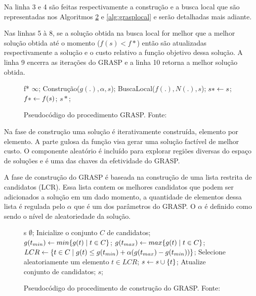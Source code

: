 Na linha 3 e 4 são feitas respectivamente a construção e a busca local que são representadas nos Algoritmos \ref{alg:graspcons} e \ref{alg:grasplocal} e serão detalhadas mais adiante.

Nas linhas 5 à 8, se a solução obtida na busca local for melhor que a melhor solução obtida até o momento ($f(s) < f{*}$) então são atualizadas respectivamente a solução e o custo relativo a função objetivo dessa solução. 
A linha 9 encerra as iterações do GRASP e a linha 10 retorna a melhor solução obtida.

\begin{figure}[h]
\caption{Pseudocódigo do procedimento GRASP. \mbox{Fonte:
\cite{resende1995}}}\label{alg:grasp}
\begin{programma}
\STATE f{*} \GETS $\infty$;
\STATE Construção($g(.), \alpha, s$);
\STATE BuscaLocal($f(.),N(.),s$);
\STATE $s{*} \leftarrow s$;
\STATE $f{*} \leftarrow f(s)$;
\ENDIF
\ENDFOR
\STATE\RETURN $s{*}$;
\ENDALGORITHM
\end{programma}
\end{figure}

Na fase de construção uma solução é iterativamente construída, elemento por elemento. A parte gulosa da função visa gerar uma solução factível de melhor custo. O componente aleatório é incluído para explorar
regiões diversas do espaço de soluções e é uma das chaves da efetividade do GRASP.

A fase de construção do GRASP é baseada na construção de uma lista restrita de candidatos (LCR). Essa lista contem os melhores candidatos que podem ser adicionados a solução em um dado momento, a quantidade de elementos dessa lista é regulada pelo $\alpha$ que é um dos parâmetros do GRASP. O $\alpha$ é definido como sendo o nível de aleatoriedade da solução.

\begin{figure}[h]
\caption{Pseudocódigo do procedimento de construção do GRASP. \mbox{Fonte:
\cite{resende1995}}}\label{alg:graspcons}
\begin{programma}
\STATE s \GETS $\emptyset$;
\STATE Inicialize o conjunto $C$ de candidatos;
\STATE $g(t_{min}) \leftarrow min\{g(t) \mid t \in C\}$;
\STATE $g(t_{max}) \leftarrow max\{g(t) \mid t \in C\}$;
\STATE $LCR \leftarrow \{t \in C \mid g(t) \leq g(t_{min}) + \alpha(g(t_{max}) - g(t_{min}))\}$;
\STATE Selecione aleatoriamente um elemento $t \in LCR$;
\STATE $s \leftarrow s \cup \{t\}$;
\STATE Atualize conjunto de candidatos;
\ENDWHILE
\STATE\RETURN $s$;
\ENDALGORITHM
\end{programma}
\end{figure}

